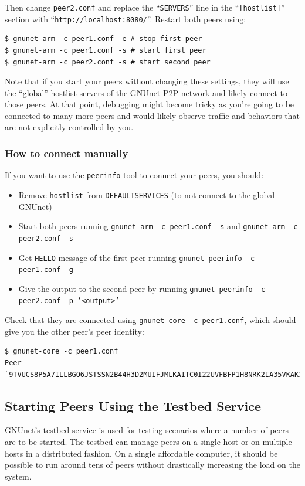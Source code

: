 \documentclass[10pt]{article}
\begin{document}
Then change {\tt peer2.conf} and replace the ``\texttt{SERVERS}'' line in the ``\texttt{[hostlist]}'' section with
``\texttt{http://localhost:8080/}''.  Restart both peers using:
\begin{lstlisting}
$ gnunet-arm -c peer1.conf -e # stop first peer
$ gnunet-arm -c peer1.conf -s # start first peer
$ gnunet-arm -c peer2.conf -s # start second peer
\end{lstlisting}

Note that if you start your peers without changing these settings, they
will use the ``global'' hostlist servers of the GNUnet P2P network and
likely connect to those peers.  At that point, debugging might become
tricky as you're going to be connected to many more peers and would 
likely observe traffic and behaviors that are not explicitly controlled
by you.

\subsubsection{How to connect manually}
If you want to use the \texttt{peerinfo} tool to connect your peers, you should:
\begin{itemize}
\itemsep0em
 \item{Remove {\tt hostlist} from {\tt DEFAULTSERVICES} (to not connect to the global GNUnet)}
 \item{Start both peers running {\tt gnunet-arm -c peer1.conf -s} and {\tt gnunet-arm -c peer2.conf -s}}
 \item{Get \texttt{HELLO} message of the first peer running {\tt gnunet-peerinfo -c peer1.conf -g}}
 \item{Give the output to the second peer by running {\tt gnunet-peerinfo -c peer2.conf -p '<output>'}}
\end{itemize}

Check that they are connected using {\tt gnunet-core -c peer1.conf}, which should give you the other peer's 
peer identity:
\begin{lstlisting}
$ gnunet-core -c peer1.conf
Peer `9TVUCS8P5A7ILLBGO6JSTSSN2B44H3D2MUIFJMLKAITC0I22UVFBFP1H8NRK2IA35VKAK16LLO0MFS7TAQ9M1KNBJ4NGCHP3JPVULDG'
\end{lstlisting}

\subsection{Starting Peers Using the Testbed Service}

GNUnet's testbed service is used for testing scenarios where a number of peers
are to be started.  The testbed can manage peers on a single host or on multiple
hosts in a distributed fashion.  On a single affordable computer, it should be
possible to run around tens of peers without drastically increasing the load on the
system.
\end{document}
